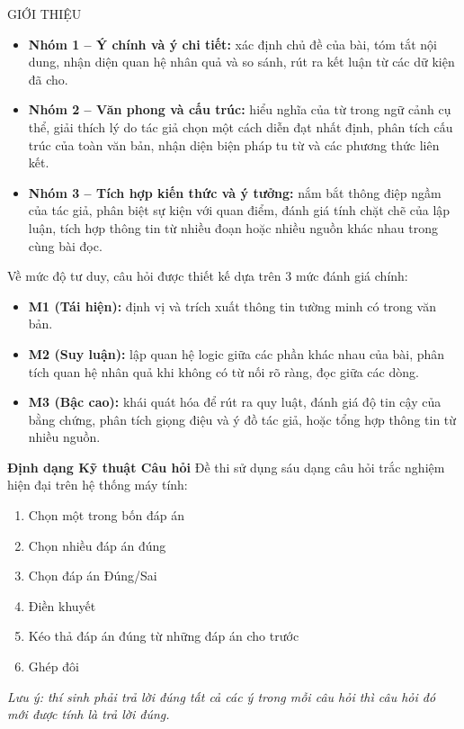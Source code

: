 \documentclass[12pt,a4paper,twoside]{article}
\begin{document}
\begin{sectionheader}{GIỚI THIỆU}
\begin{itemize}[leftmargin=*, itemsep=4pt, label=\textcolor{accentBlue}{\textbf{--}}]
\item \textbf{Nhóm 1 -- Ý chính và ý chi tiết:} xác định chủ đề của bài, tóm tắt nội dung, nhận diện quan hệ nhân quả và so sánh, rút ra kết luận từ các dữ kiện đã cho.
\item \textbf{Nhóm 2 -- Văn phong và cấu trúc:} hiểu nghĩa của từ trong ngữ cảnh cụ thể, giải thích lý do tác giả chọn một cách diễn đạt nhất định, phân tích cấu trúc của toàn văn bản, nhận diện biện pháp tu từ và các phương thức liên kết.
\item \textbf{Nhóm 3 -- Tích hợp kiến thức và ý tưởng:} nắm bắt thông điệp ngầm của tác giả, phân biệt sự kiện với quan điểm, đánh giá tính chặt chẽ của lập luận, tích hợp thông tin từ nhiều đoạn hoặc nhiều nguồn khác nhau trong cùng bài đọc.
\end{itemize}
\vspace{2pt}
Về mức độ tư duy, câu hỏi được thiết kế dựa trên 3 mức đánh giá chính:
\begin{itemize}[leftmargin=*, itemsep=3pt, label=\textcolor{accentBlue}{\textbf{--}}]
\item \textbf{M1 (Tái hiện):} định vị và trích xuất thông tin tường minh có trong văn bản.
\item \textbf{M2 (Suy luận):} lập quan hệ logic giữa các phần khác nhau của bài, phân tích quan hệ nhân quả khi không có từ nối rõ ràng, đọc giữa các dòng.
\item \textbf{M3 (Bậc cao):} khái quát hóa để rút ra quy luật, đánh giá độ tin cậy của bằng chứng, phân tích giọng điệu và ý đồ tác giả, hoặc tổng hợp thông tin từ nhiều nguồn.
\end{itemize}
\vspace{8pt}
\textbf{\textcolor{primaryBlue}{Định dạng Kỹ thuật Câu hỏi}}
\vspace{2pt}
Đề thi sử dụng sáu dạng câu hỏi trắc nghiệm hiện đại trên hệ thống máy tính:

\vspace{2pt}
\begin{enumerate}[leftmargin=2em, itemsep=2pt, label=\textcolor{primaryBlue}{\textbf{\arabic*.}}]
\item Chọn một trong bốn đáp án
\item Chọn nhiều đáp án đúng
\item Chọn đáp án Đúng/Sai
\item Điền khuyết
\item Kéo thả đáp án đúng từ những đáp án cho trước
\item Ghép đôi
\end{enumerate}
\vspace{2pt}
\textit{Lưu ý: thí sinh phải trả lời đúng tất cả các ý trong mỗi câu hỏi thì câu hỏi đó mới được tính là trả lời đúng.}

\end{sectionheader}
\end{document}
